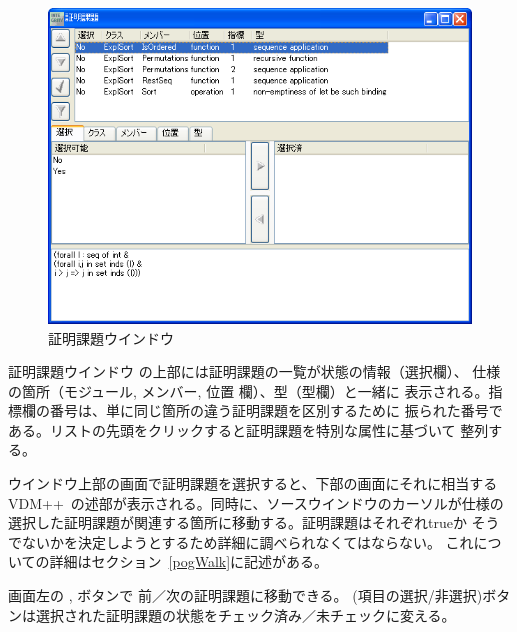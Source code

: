 \documentclass[\pformat,12pt]{jarticle}
\newcommand{\vdmslpp}{VDM++}
\newcommand{\guicmd}[1]{{\gt #1}}
\begin{document}
\begin{figure}[tbh]
\begin{center}
\includegraphics[width=12.5cm]{integWin-pp.png}
\caption{証明課題ウインドウ}
\label{fig:integWin2}
\end{center}
\end{figure}


\guicmd{証明課題ウインドウ} の上部には証明課題の一覧が状態の情報（\guicmd{選択}欄）、
仕様の箇所（\guicmd{モジュール}, \guicmd{メンバー}, \guicmd{位置} 欄）、型（\guicmd{型}欄）と一緒に
表示される。\guicmd{指標}欄の番号は、単に同じ箇所の違う証明課題を区別するために
振られた番号である。リストの先頭をクリックすると証明課題を特別な属性に基づいて
整列する。

ウインドウ上部の画面で証明課題を選択すると、下部の画面にそれに相当する
\vdmslpp\ の述部が表示される。同時に、ソースウインドウのカーソルが仕様の
選択した証明課題が関連する箇所に移動する。証明課題はそれぞれtrueか
そうでないかを決定しようとするため詳細に調べられなくてはならない。
これについての詳細はセクション~\ref{pogWalk}に記述がある。

画面左の
 ,
 ボタンで
前／次の証明課題に移動できる。 
(\guicmd{項目の選択/非選択})ボタンは選択された証明課題の状態をチェック済み／未チェックに変える。
\end{document}
